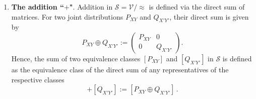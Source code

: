\documentclass[aps,pra,11pt,onecolumn,nofootinbib,tightenlines]{revtex4-2}
\theoremstyle{definition}
\begin{document}
\begin{enumerate}
We say that two joint probability distributions $P_{XY}$ and $Q_{X'Y'}$ are similar, denoted
\begin{equation}
    P_{XY} \approx Q_{X'Y'}  \,,
\end{equation}
if one can be obtained from the other by permuting rows or columns, and/or inserting or deleting rows or columns consisting entirely of zeros.
In other words, $P_{XY}$ and $Q_{X'Y'}$ represent the same distribution up to reordering of outcomes and inclusion or exclusion of impossible events. In yet other words, there is $R_{X''Y''}$ such that both $P_{XY}$ and $Q_{X'Y'}$ can be relabeled and embedded into $R_{X''Y''}$ when we lift the notion of relabeling and embedding to non-normalized distributions.
For $P \in \mathcal{V}$, we define 
    $[P] := \{ P' \in \mathcal{V} \mid P \approx P' \}$
as the equivalence class of $P$ under the relation $\approx$. The elements of the semiring are then given by the quotient set
\begin{equation}
    \mathcal{S} := \mathcal{V} / \approx,
\end{equation}
which consists of all equivalence classes of $\mathcal{V}$ under the similarity relation $\approx$.

\item \textbf{The addition ``$+$"}.
Addition in $\mathcal{S} = \mathcal{V}/\!\approx$ is defined via the direct sum of matrices. For two joint distributions $P_{XY}$ and $Q_{X'Y'}$, their direct sum is given by
\begin{equation}
    P_{XY} \oplus Q_{X'Y'} := \begin{pmatrix}
P_{XY} & 0 \\
0 & Q_{X'Y'}
\end{pmatrix}.
\end{equation}
Hence, the sum of two equivalence classes $[P_{XY}]$ and $[Q_{X'Y'}]$ in $\mathcal{S}$ is defined as the equivalence class of the direct sum of any representatives of the respective classes
\begin{equation}
    [P_{XY}] + [Q_{X'Y'}] := [P_{XY} \oplus Q_{X'Y'}] \,.
\end{equation}


\end{enumerate}
\end{document}
